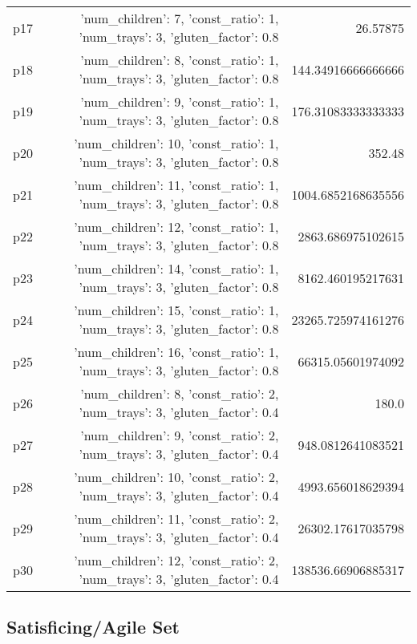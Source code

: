 \documentclass{article}
\begin{document}
\begin{center}
\begin{tabular}{r|r|r}
  p17&{'num\_children': 7, 'const\_ratio': 1, 'num\_trays': 3, 'gluten\_factor': 0.8}&26.57875\\
  p18&{'num\_children': 8, 'const\_ratio': 1, 'num\_trays': 3, 'gluten\_factor': 0.8}&144.34916666666666\\
  p19&{'num\_children': 9, 'const\_ratio': 1, 'num\_trays': 3, 'gluten\_factor': 0.8}&176.31083333333333\\
  p20&{'num\_children': 10, 'const\_ratio': 1, 'num\_trays': 3, 'gluten\_factor': 0.8}&352.48\\
  p21&{'num\_children': 11, 'const\_ratio': 1, 'num\_trays': 3, 'gluten\_factor': 0.8}&1004.6852168635556\\
  p22&{'num\_children': 12, 'const\_ratio': 1, 'num\_trays': 3, 'gluten\_factor': 0.8}&2863.686975102615\\
  p23&{'num\_children': 14, 'const\_ratio': 1, 'num\_trays': 3, 'gluten\_factor': 0.8}&8162.460195217631\\
  p24&{'num\_children': 15, 'const\_ratio': 1, 'num\_trays': 3, 'gluten\_factor': 0.8}&23265.725974161276\\
  p25&{'num\_children': 16, 'const\_ratio': 1, 'num\_trays': 3, 'gluten\_factor': 0.8}&66315.05601974092\\
  p26&{'num\_children': 8, 'const\_ratio': 2, 'num\_trays': 3, 'gluten\_factor': 0.4}&180.0\\
  p27&{'num\_children': 9, 'const\_ratio': 2, 'num\_trays': 3, 'gluten\_factor': 0.4}&948.0812641083521\\
  p28&{'num\_children': 10, 'const\_ratio': 2, 'num\_trays': 3, 'gluten\_factor': 0.4}&4993.656018629394\\
  p29&{'num\_children': 11, 'const\_ratio': 2, 'num\_trays': 3, 'gluten\_factor': 0.4}&26302.17617035798\\
  p30&{'num\_children': 12, 'const\_ratio': 2, 'num\_trays': 3, 'gluten\_factor': 0.4}&138536.66906885317
                            \end{tabular}
                            \end{center}
                    

                                \subsection*{Satisficing/Agile Set}
                                
\end{document}
